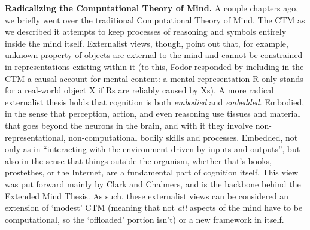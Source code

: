 \documentclass[../main.tex]{subfiles}
\begin{document}
\vspace{4pt}
\textbf{Radicalizing the Computational Theory of Mind.} A couple chapters ago, we briefly went over the traditional Computational Theory of Mind. The CTM as we described it attempts to keep processes of reasoning and symbols entirely inside the mind itself. Externalist views, though, point out that, for example, unknown property of objects are external to the mind and cannot be constrained in representations existing within it (to this, Fodor responded by including in the CTM a causal account for mental content: a mental representation R only stands for a real-world object X if Rs are reliably caused by Xs). A more radical externalist thesis holds that cognition is both \textit{embodied} and \textit{embedded}. Embodied, in the sense that perception, action, and even reasoning use tissues and material that goes beyond the neurons in the brain, and with it they involve non-representational, non-computational bodily skills and processes. Embedded, not only as in ``interacting with the environment driven by inputs and outputs'', but also in the sense that things outside the organism, whether that's books, prostethes, or the Internet, are a fundamental part of cognition itself. This view was put forward mainly by Clark\cite{clarkNaturalbornCyborgsMinds2003} and Chalmers\cite{clarkExtendedMind1998b}, and is the backbone behind the Extended Mind Thesis. As such, these externalist views can be considered an extension of `modest' CTM (meaning that not \textit{all} aspects of the mind have to be computational, so the `offloaded' portion isn't) or a new framework in itself.
\end{document}
